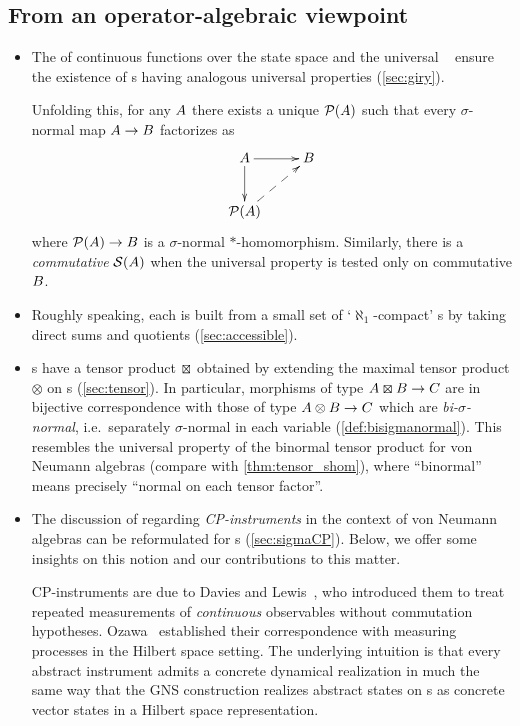 \subsection*{From an operator-algebraic viewpoint}
\begin{itemize}
	\item The \cstar{} of continuous functions over the state space and the universal \cstar{}~\cite[Proposition 8]{kirchberg1998Cstarfromoperator} ensure the existence of \cstars{}s having analogous universal properties (\cref{sec:giry}).

	      Unfolding this, for any \cstars{} ${A}$ there exists a unique \cstars{} $\mathcal{P}({A})$ such that every $\sigma$-normal \cpu{} map ${A} \to {B}$ factorizes as
	      \[
		      \xymatrix{\A\ar[r]\ar[d] & \B\\ \mathcal{P}(\A)\ar@{-->}[ru]}
	      \]
	      where $\mathcal{P}({A})\to {B}$ is a $\sigma$-normal $*$-homomorphism.
	      Similarly, there is a \emph{commutative} \cstars{} $\mathcal{S}({A})$ when the universal property is tested only on commutative ${B}$.
	\item Roughly speaking, each \cstars{} is built from a small set of `$\aleph_1$-compact' \cstars{}s by taking direct sums and quotients (\cref{sec:accessible}).
	\item \cstars{}s have a tensor product $\kocktensor$ obtained by extending the maximal tensor product $\otimes$ on \cstar{}s (\cref{sec:tensor}).
	      In particular, morphisms of type $\A \kocktensor \B \to \C$ are in bijective correspondence with those of type ${A} \otimes {B} \to {C}$ which are \emph{bi-$\sigma$-normal}, i.e.\ separately $\sigma$-normal in each variable (\cref{def:bisigmanormal}).
	      This resembles the universal property of the binormal tensor product for von Neumann algebras (compare \cite[Proposition 2.1]{okamura2015measurement} with \cref{thm:tensor_shom}), where ``binormal'' means precisely ``normal on each tensor factor''.
	\item The discussion of \cite{okamura2015measurement} regarding \emph{CP-instruments} in the context of von Neumann algebras can be reformulated for \cstars{}s (\cref{sec:sigmaCP}). 
	Below, we offer some insights on this notion and our contributions to this matter.

	CP-instruments are due to Davies and Lewis~\cite{davies1970operational}, who introduced them to treat repeated measurements of \emph{continuous} observables without commutation hypotheses. Ozawa~\cite{ozawa1984quantummeasuring} established their correspondence with measuring processes in the Hilbert space setting. 
	The underlying intuition is that every abstract instrument admits a concrete dynamical realization in much the same way that the GNS construction realizes abstract states on \cstar{}s as concrete vector states in a Hilbert space representation.


\end{itemize}

